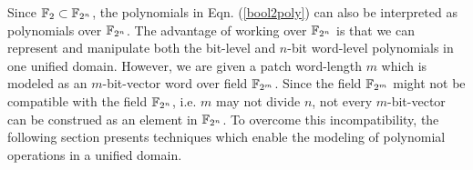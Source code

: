 
Since ${\mathbb{F}}_2 \subset {\mathbb{F}}_{2^n}$, the polynomials in Eqn. (\ref{bool2poly}) can also 
be interpreted as polynomials over ${\mathbb{F}}_{2^n}$. The advantage of working
over ${\mathbb{F}}_{2^n}$ is that we can represent and manipulate both the bit-level 
and $n$-bit word-level polynomials in one unified domain. However, we
are given a patch word-length $m$ which is modeled as an
$m$-bit-vector word over field ${\mathbb{F}}_{2^m}$.  Since the field ${\mathbb{F}}_{2^m}$ might
not be compatible with the field ${\mathbb{F}}_{2^n}$, i.e. $m$ may not divide $n$,
not every $m$-bit-vector can be construed as an element in ${\mathbb{F}}_{2^n}$. 
To overcome this incompatibility, the following section presents
techniques which enable the modeling of polynomial operations in a
unified domain. 

